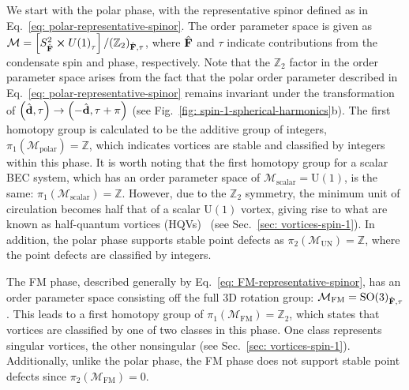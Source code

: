 We start with the polar phase, with the representative spinor defined as in
Eq.~\eqref{eq: polar-representative-spinor}.
The order parameter space is given as \(\mathcal{M} = \left[S^2_{\hat{\vb{F}}}
\cross {U(1)}_\tau\right] / {({\mathbb{Z}}_2)}_{\hat{\vb{F}}, \tau} \), where
\(\hat{\vb{F}}\) and \(\tau \) indicate contributions from the condensate spin
and phase, respectively.
Note that the \(\mathbb{Z}_2\) factor in the order parameter space arises from
the fact that the polar order parameter described in
Eq.~\eqref{eq: polar-representative-spinor} remains invariant under the
transformation of \(\left(\hat{\vb{d}}, \tau\right)
\rightarrow \left(-\hat{\vb{d}}, \tau+\pi\right)\)
(see Fig.~\ref{fig: spin-1-spherical-harmonics}b).
The first homotopy group is calculated to be the additive group of integers,
\(\pi_1(\mathcal{M}_\text{polar}) = \mathbb{Z}\), which indicates vortices are
stable and classified by integers within this phase.
It is worth noting that the first homotopy group for a scalar BEC system,
which has an order parameter space of \(\mathcal{M}_\text{scalar}
= \text{U}(1)\), is the same: \(\pi_1(\mathcal{M}_\text{scalar}) = \mathbb{Z}\).
However, due to the \({\mathbb{Z}}_2\) symmetry, the minimum unit of circulation
becomes half that of a scalar \(\text{U}(1)\) vortex, giving rise to what are
known as half-quantum vortices (HQVs)~\cite{Kawaguchi2012} (see
Sec.~\ref{sec: vortices-spin-1}).
In addition, the polar phase supports stable point defects as
\(\pi_2(\mathcal{M}_\text{UN}) = \mathbb{Z}\), where the point defects are
classified by integers.

The FM phase, described generally by Eq.~\eqref{eq: FM-representative-spinor},
has an order parameter space consisting off the full 3D rotation group:
\(\mathcal{M}_\text{FM} = {\text{SO}(3)}_{\hat{\vb{F}}, \tau}\).
This leads to a first homotopy group of \(\pi_1(\mathcal{M}_\text{FM})
= {\mathbb{Z}}_2\), which states that vortices are classified by one of two
classes in this phase.
One class represents singular vortices, the other nonsingular (see
Sec.~\ref{sec: vortices-spin-1}).
Additionally, unlike the polar phase, the FM phase does not support stable point
defects since \(\pi_2(\mathcal{M}_\text{FM}) = 0\).

